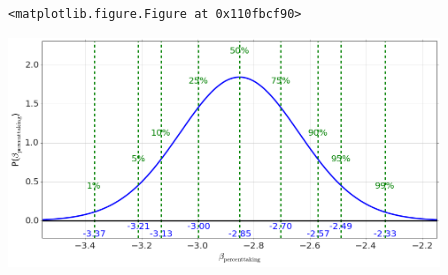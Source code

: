 \begin{verbatim}
<matplotlib.figure.Figure at 0x110fbcf90>\end{verbatim}

\begin{center}\includegraphics[width=4.5in]{Regression/Regression_fig12.png}\end{center}

\begin{lstlisting}

\end{lstlisting}


